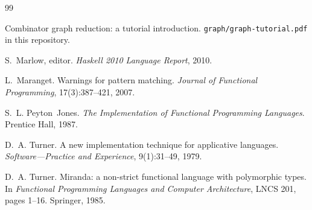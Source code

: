 \documentclass[11pt,a4paper]{article}
\theoremstyle{definition}
\theoremstyle{plain}
\begin{document}
\begin{thebibliography}{99}
\small

Combinator graph reduction: a tutorial introduction.
\newblock \texttt{graph/graph-tutorial.pdf} in this repository.

S.~Marlow, editor.
\newblock \emph{Haskell 2010 Language Report}, 2010.

L.~Maranget.
\newblock Warnings for pattern matching.
\newblock \emph{Journal of Functional Programming}, 17(3):387--421, 2007.

S.~L. Peyton~Jones.
\newblock \emph{The Implementation of Functional Programming Languages}.
\newblock Prentice Hall, 1987.

D.~A. Turner.
\newblock A new implementation technique for applicative languages.
\newblock \emph{Software---Practice and Experience}, 9(1):31--49, 1979.

D.~A. Turner.
\newblock Miranda: a non-strict functional language with polymorphic types.
\newblock In \emph{Functional Programming Languages and Computer
  Architecture}, LNCS 201, pages 1--16. Springer, 1985.

\end{thebibliography}
\end{document}
